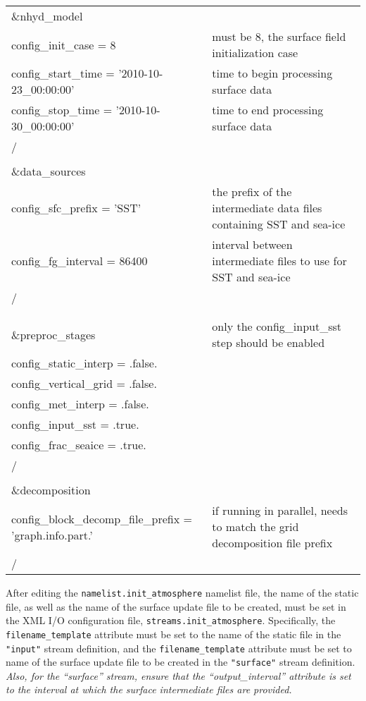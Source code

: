 \begin{longtable}{p{3.0in} |p{3.25in}}

\&nhyd\_model\\
   config\_init\_case       = 8                      & must be 8, the surface field initialization case \\
   config\_start\_time      = '2010-10-23\_00:00:00' & time to begin processing surface data \\
   config\_stop\_time       = '2010-10-30\_00:00:00' & time to end processing surface data \\
/\\
\\
\&data\_sources\\
   config\_sfc\_prefix      = 'SST'                  & the prefix of the intermediate data files containing SST and sea-ice \\
   config\_fg\_interval     = 86400                  & interval between intermediate files to use for SST and sea-ice \\
/\\
\\
\\
\&preproc\_stages                                    & only the config\_input\_sst step should be enabled \\
   config\_static\_interp   = .false.                & \\
   config\_vertical\_grid   = .false.                & \\
   config\_met\_interp      = .false.                & \\
   config\_input\_sst       = .true.                 & \\
   config\_frac\_seaice    = .true.                 & \\
/\\
\\
\&decomposition\\
   config\_block\_decomp\_file\_prefix = 'graph.info.part.' & if running in parallel, needs to match the grid decomposition file prefix \\
/\\

\end{longtable}

After editing the {\tt namelist.init\_atmosphere} namelist file, the name of the static file, as well as the name of the surface update file to be created, must be set in the XML I/O configuration file, {\tt streams.init\_atmosphere}. Specifically, the {\tt filename\_template} attribute must be set to the name of the static file in the {\tt "input"} stream definition, and the {\tt filename\_template} attribute must be set to name of the surface update file to be created in the {\tt "surface"} stream definition. {\em Also, for the ``surface'' stream, ensure that the ``output\_interval'' attribute is set to the interval at which the surface intermediate files are provided.}

